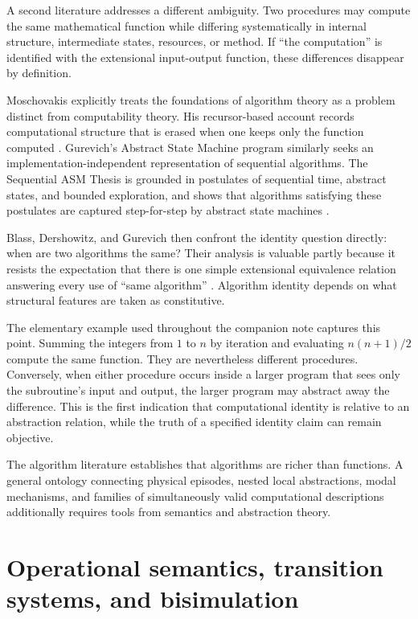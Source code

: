 \documentclass[11pt,a4paper]{article}
\begin{document}
A second literature addresses a different ambiguity. Two procedures may compute the same mathematical function while differing systematically in internal structure, intermediate states, resources, or method. If ``the computation'' is identified with the extensional input-output function, these differences disappear by definition.

Moschovakis explicitly treats the foundations of algorithm theory as a problem distinct from computability theory. His recursor-based account records computational structure that is erased when one keeps only the function computed \cite{Moschovakis2001}. Gurevich's Abstract State Machine program similarly seeks an implementation-independent representation of sequential algorithms. The Sequential ASM Thesis is grounded in postulates of sequential time, abstract states, and bounded exploration, and shows that algorithms satisfying these postulates are captured step-for-step by abstract state machines \cite{Gurevich2000}.

Blass, Dershowitz, and Gurevich then confront the identity question directly: when are two algorithms the same? Their analysis is valuable partly because it resists the expectation that there is one simple extensional equivalence relation answering every use of ``same algorithm'' \cite{Blass2009}. Algorithm identity depends on what structural features are taken as constitutive.

The elementary example used throughout the companion note captures this point. Summing the integers from $1$ to $n$ by iteration and evaluating $n(n+1)/2$ compute the same function. They are nevertheless different procedures. Conversely, when either procedure occurs inside a larger program that sees only the subroutine's input and output, the larger program may abstract away the difference. This is the first indication that computational identity is relative to an abstraction relation, while the truth of a specified identity claim can remain objective.

\begin{gapbox}
The algorithm literature establishes that algorithms are richer than functions. A general ontology connecting physical episodes, nested local abstractions, modal mechanisms, and families of simultaneously valid computational descriptions additionally requires tools from semantics and abstraction theory.
\end{gapbox}

\section{Operational semantics, transition systems, and bisimulation}
\end{document}
